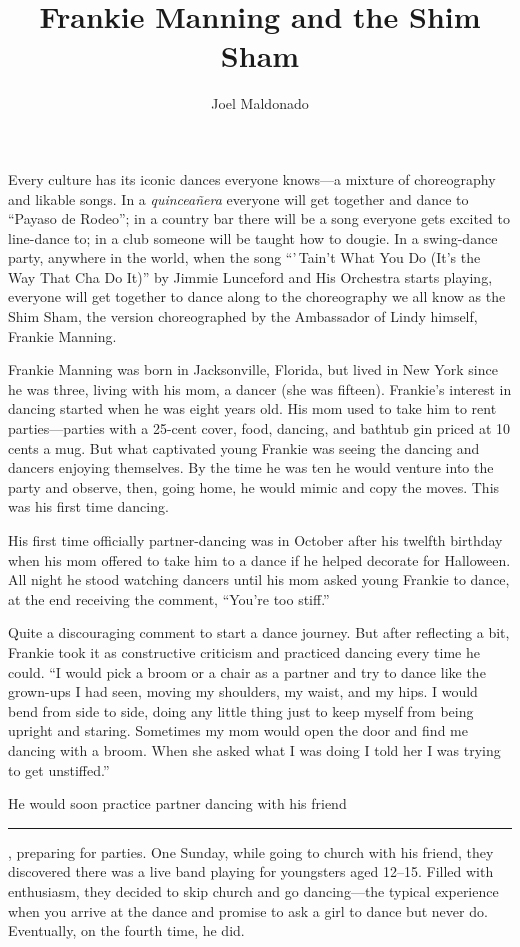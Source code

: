 \documentclass[12pt]{article}
\title{Frankie Manning and the Shim Sham}
\author{Joel Maldonado}
\date{}
\begin{document}
\maketitle

Every culture has its iconic dances everyone knows—a mixture of choreography and likable songs. In a \emph{quinceañera} everyone will get together and dance to ``Payaso de Rodeo''; in a country bar there will be a song everyone gets excited to line-dance to; in a club someone will be taught how to dougie. In a swing-dance party, anywhere in the world, when the song ``'\,Tain't What You Do (It's the Way That Cha Do It)'' by Jimmie Lunceford and His Orchestra starts playing, everyone will get together to dance along to the choreography we all know as the Shim Sham, the version choreographed by the Ambassador of Lindy himself, Frankie Manning.

Frankie Manning was born in Jacksonville, Florida, but lived in New York since he was three, living with his mom, a dancer (she was fifteen). Frankie’s interest in dancing started when he was eight years old. His mom used to take him to rent parties—parties with a 25-cent cover, food, dancing, and bathtub gin priced at 10 cents a mug. But what captivated young Frankie was seeing the dancing and dancers enjoying themselves. By the time he was ten he would venture into the party and observe, then, going home, he would mimic and copy the moves. This was his first time dancing.

His first time officially partner-dancing was in October after his twelfth birthday when his mom offered to take him to a dance if he helped decorate for Halloween. All night he stood watching dancers until his mom asked young Frankie to dance, at the end receiving the comment, ``You’re too stiff.''

Quite a discouraging comment to start a dance journey. But after reflecting a bit, Frankie took it as constructive criticism and practiced dancing every time he could. ``I would pick a broom or a chair as a partner and try to dance like the grown-ups I had seen, moving my shoulders, my waist, and my hips. I would bend from side to side, doing any little thing just to keep myself from being upright and staring. Sometimes my mom would open the door and find me dancing with a broom. When she asked what I was doing I told her I was trying to get unstiffed.''

He would soon practice partner dancing with his friend \rule{2cm}{0.15mm}, preparing for parties. One Sunday, while going to church with his friend, they discovered there was a live band playing for youngsters aged 12–15. Filled with enthusiasm, they decided to skip church and go dancing—the typical experience when you arrive at the dance and promise to ask a girl to dance but never do. Eventually, on the fourth time, he did.
\end{document}
